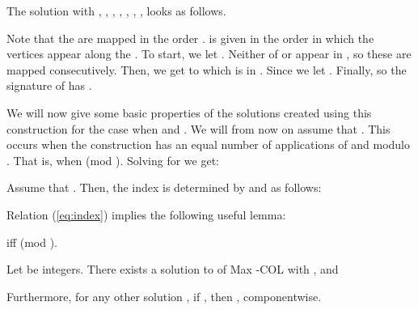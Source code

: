 \documentclass[11pt,a4paper]{article}
\begin{document}
\begin{exmp}
The solution  with , , , , , , ,  looks as follows.

Note that the  are mapped in the order .
 is given in the order in which the vertices appear along the .
To start, we let . Neither of  or  appear in
, so these are mapped consecutively.
Then, we get to  which is in .
Since  we let . 
Finally,  so the signature of  has .   
\end{exmp}

We will now give some basic properties of the solutions created using this
construction for the case when  and .
We will from now on assume that . 
This occurs when the construction has an equal number of applications of
 and  modulo . That is, when  (mod ).
Solving for  we get:

Assume that .
Then, the index  is determined by  and
 as follows:







\noindent
Relation (\ref{eq:index}) implies the following useful lemma:

\begin{lemma} \label{lem:usefulcong}
   iff
   (mod ).
\end{lemma}










\begin{lemma}
\label{lem:solbeta}
Let  be integers.
There exists a solution  to  of {\sc Max -COL} with , and

Furthermore, for any other solution , if , then ,
componentwise.
\end{lemma}
\end{document}
